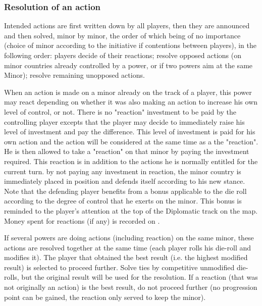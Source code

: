 \subsubsection{Resolution of an action}
 Intended actions are first written down by all
players, then they are announced and then solved, minor by minor, the order of
which being of no importance (choice of minor according to the initiative if
contentions between players), in the following order:
\bparag players decide of their reactions;
\bparag resolve opposed actions (on minor countries already controlled by a
power, or if two powers aim at the same Minor);
\bparag resolve remaining unopposed actions.

\bparag When an action is made on a minor already on the track of a player,
this power may react depending on whether it was also making an action to
increase his own level of control, or not.
 There is no "reaction" investment to
be paid by the controlling player excepts that the player may decide to
immediately raise his level of investment and pay the difference. This level
of investment is paid for his own action and the action will be considered at
the same time as a the "reaction".
 He is then allowed to take a "reaction" on that minor by paying the
investment required. This reaction is in addition to the actions he is
normally entitled for the current turn.
 by not paying any investment in reaction, the minor country is
immediately placed in \Neutral position and defends itself according to his
new \Neutral stance.
\bparag Note that the defending player benefits from a bonus applicable to the
die roll according to the degree of control that he exerts on the minor.  This
bonus is reminded to the player's attention at the top of the Diplomatic track
on the map.
\bparag Money spent for reactions (if any) is recorded on
.

If several powers are doing actions (including reaction) on the same minor,
these actions are resolved together at the same time (each player rolls his
die-roll and modifies it). The player that obtained the best result (i.e. the
highest modified result) is selected to proceed further.
\bparag Solve ties by competitive unmodified die-rolls, but the original
result will be used for the resolution.
\bparag If a reaction (that was not originally an action) is the best result,
do not proceed further (no progression point can be gained, the reaction only
served to keep the minor).

